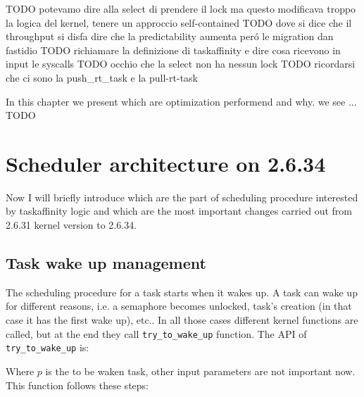 TODO potevamo dire alla select di prendere il lock ma questo modificava troppo la logica del kernel, tenere un approccio self-contained
TODO dove si dice che il throughput si disfa dire che la predictability aumenta per\'o le migration dan fastidio
TODO richiamare la definizione di taskaffinity e dire cosa ricevono in input le syscalls
TODO occhio che la select non ha nessun lock
TODO ricordarsi che ci sono la push\_rt\_task e la pull-rt-task

In this chapter we present which are optimization performend and why. we see ... TODO 

\section{Scheduler architecture on 2.6.34}

Now I will briefly introduce which are the part of scheduling procedure interested by taskaffinity logic and which are the most important changes carried 
out from 2.6.31 kernel version to 2.6.34.

\subsection{Task wake up management}

The scheduling procedure for a task starts when it wakes up. A task can wake up
for different reasons, i.e. a semaphore becomes unlocked, task's creation
(in that case it has the first wake up), etc.. In all those cases different
kernel functions are called, but at the end they call 
\texttt{try\_to\_wake\_up} function. The API of \texttt{try\_to\_wake\_up} is:

\lstset{basicstyle=\footnotesize, language=c, captionpos=b, frame=single, label=lis:API\_ttwu}


Where $p$ is the to be waken task, other input parameters are not important now.
This function follows these steps:

